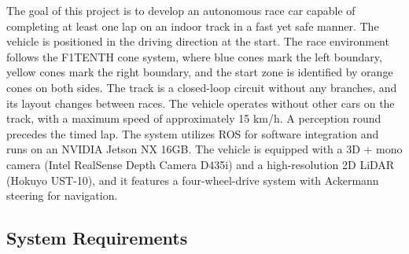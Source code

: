 The goal of this project is to develop an autonomous race car capable of completing at least one lap on an indoor track in a fast yet safe manner.
The vehicle is positioned in the driving direction at the start. The race environment follows the F1TENTH cone system, where blue cones mark the left boundary, yellow cones mark the right boundary, and the start zone is identified by orange cones on both sides. 
The track is a closed-loop circuit without any branches, and its layout changes between races. The vehicle operates without other cars on the track, with a maximum speed of approximately 15 km/h. 
A perception round precedes the timed lap. The system utilizes ROS for software integration and runs on an NVIDIA Jetson NX 16GB. The vehicle is equipped with a 3D + mono camera (Intel RealSense Depth Camera D435i) and a high-resolution 2D LiDAR (Hokuyo UST-10), and it features a four-wheel-drive system with Ackermann steering for navigation.
\subsection{System Requirements}

